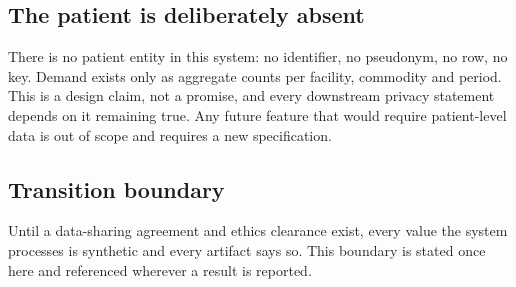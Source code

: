 \subsection{The patient is deliberately absent}
There is no patient entity in this system: no identifier, no pseudonym, no row, no key.
Demand exists only as aggregate counts per facility, commodity and period. This is a
design claim, not a promise, and every downstream privacy statement depends on it
remaining true. Any future feature that would require patient-level data is out of scope
and requires a new specification.

\subsection{Transition boundary}
Until a data-sharing agreement and ethics clearance exist, every value the system
processes is synthetic and every artifact says so. This boundary is stated once here and
referenced wherever a result is reported.
